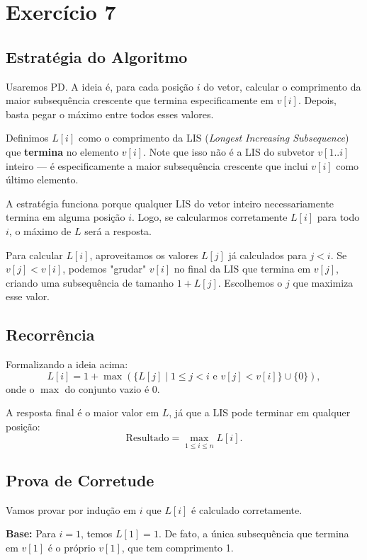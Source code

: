 \documentclass[a4paper,12pt]{article}
\begin{document}
\section*{Exercício 7}

\subsection*{Estratégia do Algoritmo}
Usaremos PD. A ideia é, para cada posição $i$ do vetor, calcular o comprimento da maior subsequência crescente que termina especificamente em $v[i]$. Depois, basta pegar o máximo entre todos esses valores.

Definimos $L[i]$ como o comprimento da LIS (\textit{Longest Increasing Subsequence}) que \textbf{termina} no elemento $v[i]$. Note que isso não é a LIS do subvetor $v[1..i]$ inteiro — é especificamente a maior subsequência crescente que inclui $v[i]$ como último elemento.

A estratégia funciona porque qualquer LIS do vetor inteiro necessariamente termina em alguma posição $i$. Logo, se calcularmos corretamente $L[i]$ para todo $i$, o máximo de $L$ será a resposta.

Para calcular $L[i]$, aproveitamos os valores $L[j]$ já calculados para $j < i$. Se $v[j] < v[i]$, podemos "grudar" $v[i]$ no final da LIS que termina em $v[j]$, criando uma subsequência de tamanho $1 + L[j]$. Escolhemos o $j$ que maximiza esse valor.

\subsection*{Recorrência}
Formalizando a ideia acima:
\begin{equation}
L[i] = 1 + \max(\{L[j] \mid 1 \le j < i \text{ e } v[j] < v[i]\} \cup \{0\}),
\end{equation}
onde o $\max$ do conjunto vazio é 0.

A resposta final é o maior valor em $L$, já que a LIS pode terminar em qualquer posição:
\begin{equation}
\text{Resultado} = \max_{1 \le i \le n} L[i].
\end{equation}
\subsection*{Prova de Corretude}
Vamos provar por indução em $i$ que $L[i]$ é calculado corretamente.

\textbf{Base:} Para $i=1$, temos $L[1] = 1$. De fato, a única subsequência que termina em $v[1]$ é o próprio $v[1]$, que tem comprimento 1.
\end{document}
